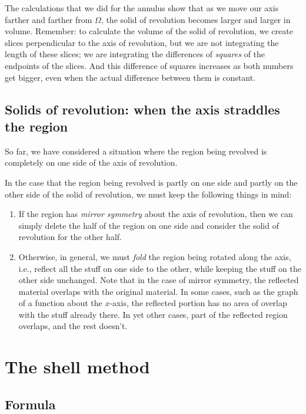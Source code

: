 \documentclass[10pt]{amsart}
\begin{document}
The calculations that we did for the annulus show that as we move our
axis farther and farther from $\Omega$, the solid of revolution
becomes larger and larger in volume. Remember: to calculate the volume
of the solid of revolution, we create slices perpendicular to the axis
of revolution, but we are not integrating the length of these slices;
we are integrating the differences of {\em squares} of the endpoints
of the slices. And this difference of squares increases as both
numbers get bigger, even when the actual difference between them is
constant.

\subsection{Solids of revolution: when the axis straddles the region}

So far, we have considered a situation where the region being revolved
is completely on one side of the axis of revolution.

In the case that the region being revolved is partly on one side and
partly on the other side of the solid of revolution, we must keep the
following things in mind:

\begin{enumerate}
\item If the region has {\em mirror symmetry} about the axis of
  revolution, then we can simply delete the half of the region on one
  side and consider the solid of revolution for the other half.
\item Otherwise, in general, we must {\em fold} the region being
  rotated along the axis, i.e., reflect all the stuff on one side to
  the other, while keeping the stuff on the other side unchanged. Note
  that in the case of mirror symmetry, the reflected material overlaps
  with the original material. In some cases, such as the graph of a
  function about the $x$-axis, the reflected portion has no area of
  overlap with the stuff already there. In yet other cases, part of
  the reflected region overlaps, and the rest doesn't.
\end{enumerate}

\section{The shell method}

\subsection{Formula}
\end{document}
